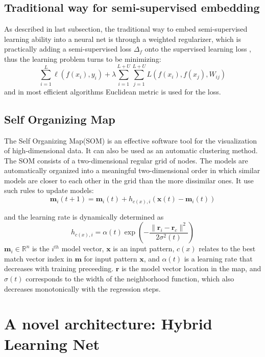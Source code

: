 \documentclass[3p,times,procedia]{elsarticle}
\begin{document}
\subsection{Traditional way for 
semi-supervised embedding}
As described in last subsection, 
the traditional way to embed semi-supervised 
learning ability into a neural net is through 
a weighted regularizer, which is practically 
adding a semi-supervised loss $\Delta_f$
onto the supervised learning loss
\cite{weston2012deep}, thus the learning 
problem turns to be minimizing:
\begin{equation}
	\sum^L_{i=1}\ell(f(x_i),y_i)+
	\lambda\sum^{L+U}_{i=1}\sum^{L+U}_{j=1}
	L\left(f(x_i),f(x_j),W_{ij}\right)
	\label{eq:7}
\end{equation}
and in most efficient algorithms Euclidean 
metric is used for the loss.

\subsection{Self Organizing Map}
The Self Organizing Map(SOM) is an effective 
software tool for the visualization of 
high-dimensional data. It can also be used 
as an automatic clustering method. The SOM
consists of a two-dimensional regular grid
of nodes. The models are automatically 
organized into a meaningful two-dimensional
order in which similar models are closer to
each other in the grid than the more dissimilar
ones\cite{kohonen1998self}.
It use such rules to update models:
\begin{equation}
	\mathbf{m}_i(t+1)=\mathbf{m}_i(t)+
	h_{c(x),i}\left(
	\mathbf{x}(t)-\mathbf{m}_i(t)
	\right)
	\label{eq:8}
\end{equation}

and the learning rate is dynamically determined
as
\begin{equation}
	h_{c(x),i} = \alpha(t)\exp\left(
	-\frac{\|\mathbf{r}_i-\mathbf{r}_c\|^2}
	{2\sigma^2(t)}
	\right)
\end{equation}
$\mathbf{m}_i\in\mathbb{R}^n$ is the $i^{th}$
model vector, $\mathbf{x}$ is an input pattern,
$c(x)$ relates to the best match vector index
in $\mathbf{m}$ for input pattern $\mathbf{x}$,
and $\alpha(t)$ is a learning rate that 
decreases with training preceeding.
$\mathbf{r}$ is the model vector location in 
the map, and $\sigma(t)$ corresponds to the 
width of the neighborhood function, which 
also decreases monotonically with the 
regression steps.


\section{A novel architecture: 
Hybrid Learning Net}
\end{document}
